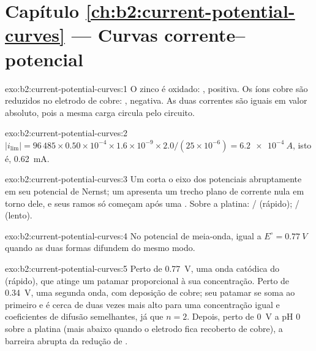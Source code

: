 \section*{Capítulo \ref{ch:b2:current-potential-curves} --- Curvas corrente--potencial}

\begin{solution}{exo:b2:current-potential-curves:1}
O zinco é oxidado: , positiva. Os íons cobre são reduzidos no
eletrodo de cobre: , negativa. As duas correntes são iguais
em valor absoluto, pois a mesma carga circula pelo circuito.
\end{solution}

\begin{solution}{exo:b2:current-potential-curves:2}
$|i_{\lim}| = 96\,485 \times 0.50 \times 10^{-4} \times 1.6 \times 10^{-9} \times
2.0/(25 \times 10^{-6}) = \qty{6.2e-4}{A}$, isto é, \qty{0.62}{mA}.
\end{solution}

\begin{solution}{exo:b2:current-potential-curves:3}
Um  corta o eixo dos potenciais abruptamente em seu potencial de
Nernst; um  apresenta um trecho plano de corrente nula em torno
dele, e seus ramos só começam após uma . Sobre a platina:
/ (rápido); / (lento).
\end{solution}

\begin{solution}{exo:b2:current-potential-curves:4}
No potencial de meia-onda, igual a $E^\circ = \qty{0.77}{V}$ quando as duas
formas difundem do mesmo modo.
\end{solution}

\begin{solution}{exo:b2:current-potential-curves:5}
Perto de \qty{0.77}{V}, uma onda catódica do  (rápido), que atinge um
patamar proporcional à sua concentração. Perto de \qty{0.34}{V}, uma segunda
onda, com deposição de cobre; seu patamar se soma ao primeiro e é cerca de
duas vezes mais alto para uma concentração igual e coeficientes de difusão
semelhantes, já que $n = 2$. Depois, perto de \qty{0}{V} a pH 0 sobre a platina
(mais abaixo quando o eletrodo fica recoberto de cobre), a barreira abrupta
da redução de .
\end{solution}

